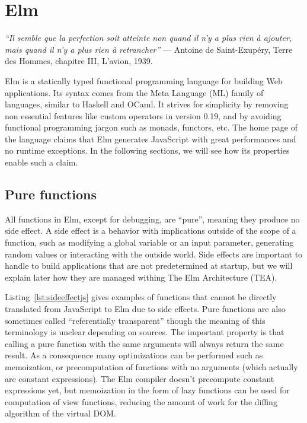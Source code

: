 \section{Elm}%
\label{sec:elm}

\begin{displayquote}
	\textit{``Il semble que la perfection soit atteinte non quand il n’y a plus rien à ajouter,
	mais quand il n’y a plus rien à retrancher''}
	--- Antoine de Saint-Exupéry, Terre des Hommes, chapitre III, L'avion, 1939.
\end{displayquote}

Elm is a statically typed functional programming language for building Web applications.
Its syntax comes from the Meta Language (ML) family of languages, similar to Haskell and OCaml.
It strives for simplicity by removing non essential features
like custom operators in version 0.19,
and by avoiding functional programming jargon such as monads, functors, etc.
The home page of the language claims that Elm generates JavaScript
with great performances and no runtime exceptions.
In the following sections, we will see how its properties enable such a claim.

\subsection{Pure functions}%
\label{sub:pure_functions}

All functions in Elm, except for debugging, are ``pure'',
meaning they produce no side effect.
A side effect is a behavior with implications outside of the scope of a function,
such as modifying a global variable or an input parameter,
generating random values or interacting with the outside world.
Side effects are important to handle to build applications that are not predetermined
at startup, but we will explain later how they are managed withing The Elm Architecture (TEA).

Listing~\ref{lst:sideeffectjs} gives examples of functions that cannot be directly
translated from JavaScript to Elm due to side effects.
Pure functions are also sometimes called ``referentially transparent''
though the meaning of this terminology is unclear depending on sources.
The important property is that calling a pure function with the same arguments
will always return the same result.
As a consequence many optimizations can be performed such as memoization,
or precomputation of functions with no arguments (which actually are constant expressions).
The Elm compiler doesn't precompute constant expressions yet,
but memoization in the form of lazy functions can be used for computation
of view functions, reducing the amount of work for the diffing algorithm
of the virtual DOM.\@

